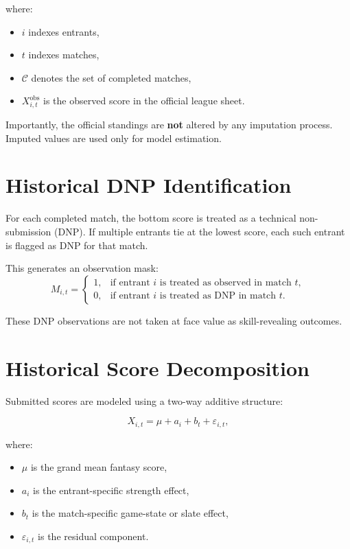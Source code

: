 \documentclass[11pt]{article}
\begin{document}
where:
\begin{itemize}[itemsep=2pt]
    \item $i$ indexes entrants,
    \item $t$ indexes matches,
    \item $\mathcal{C}$ denotes the set of completed matches,
    \item $X_{i,t}^{\text{obs}}$ is the observed score in the official league sheet.
\end{itemize}

Importantly, the official standings are \textbf{not} altered by any imputation process. Imputed values are used only for model estimation.

\section{Historical DNP Identification}

For each completed match, the bottom score is treated as a technical non-submission (DNP). If multiple entrants tie at the lowest score, each such entrant is flagged as DNP for that match.

This generates an observation mask:
$$
M_{i,t} =
\begin{cases}
1, & \text{if entrant } i \text{ is treated as observed in match } t, \\
0, & \text{if entrant } i \text{ is treated as DNP in match } t.
\end{cases}
$$

These DNP observations are not taken at face value as skill-revealing outcomes.

\section{Historical Score Decomposition}

Submitted scores are modeled using a two-way additive structure:

\begin{equation}
X_{i,t} = \mu + a_i + b_t + \varepsilon_{i,t},
\end{equation}

where:
\begin{itemize}[itemsep=2pt]
    \item $\mu$ is the grand mean fantasy score,
    \item $a_i$ is the entrant-specific strength effect,
    \item $b_t$ is the match-specific game-state or slate effect,
    \item $\varepsilon_{i,t}$ is the residual component.
\end{itemize}
\end{document}
